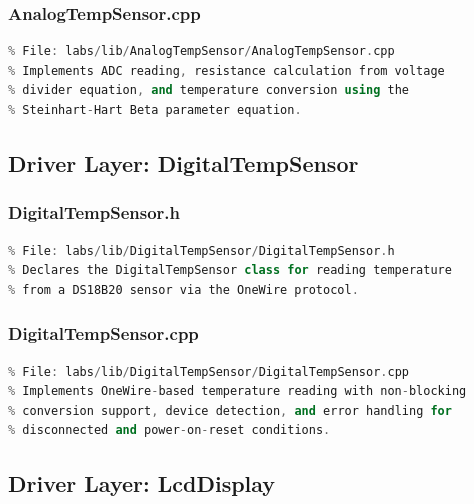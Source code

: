 \subsubsection{AnalogTempSensor.cpp}
\begin{lstlisting}[language=C++, caption=AnalogTempSensor.cpp --- NTC Thermistor Driver Implementation, label=lst:appendix_analog_temp_cpp]
% [Full source code - see GitHub repository]
% File: labs/lib/AnalogTempSensor/AnalogTempSensor.cpp
% Implements ADC reading, resistance calculation from voltage
% divider equation, and temperature conversion using the
% Steinhart-Hart Beta parameter equation.
\end{lstlisting}

\subsection{Driver Layer: DigitalTempSensor}

\subsubsection{DigitalTempSensor.h}
\begin{lstlisting}[language=C++, caption=DigitalTempSensor.h --- DS18B20 OneWire Driver Interface, label=lst:appendix_digital_temp_h]
% [Full source code - see GitHub repository]
% File: labs/lib/DigitalTempSensor/DigitalTempSensor.h
% Declares the DigitalTempSensor class for reading temperature
% from a DS18B20 sensor via the OneWire protocol.
\end{lstlisting}

\subsubsection{DigitalTempSensor.cpp}
\begin{lstlisting}[language=C++, caption=DigitalTempSensor.cpp --- DS18B20 OneWire Driver Implementation, label=lst:appendix_digital_temp_cpp]
% [Full source code - see GitHub repository]
% File: labs/lib/DigitalTempSensor/DigitalTempSensor.cpp
% Implements OneWire-based temperature reading with non-blocking
% conversion support, device detection, and error handling for
% disconnected and power-on-reset conditions.
\end{lstlisting}

\subsection{Driver Layer: LcdDisplay}

